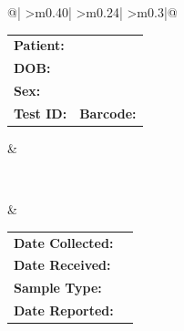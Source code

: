 \documentclass[10pt, letterpaper]{article}
\begin{document}
\begin{tabularx}{\textwidth}{@{}|%
    >{\RaggedRight\arraybackslash}m{0.40\textwidth}|%
    >{\centering\arraybackslash}m{0.24\textwidth}|%
    >{\RaggedRight\arraybackslash}m{0.3\textwidth}|@{}}
\begin{minipage}[t]{\linewidth}
  \vspace{0.5pt}
  \BodyFont
  \begin{tabular}{@{}l l@{}}
    \textbf{Patient:} & \Val{PatientFirstName} \Val{PatientLastName} \\[4pt]
    \textbf{DOB:}     & \Val{PatientDOB} \\[4pt]
    \textbf{Sex:}     & \Val{PatientSex} \\[6pt]
    \textbf{Test ID:} & \Val{TestID} \quad \textbf{Barcode:} \Val{Barcode}
  \end{tabular}
  \vspace{2pt}
\end{minipage}
&
\begin{minipage}[t]{\linewidth}
  \vspace{3pt}
  \BodyFont
  \centering
  \\[8pt]
  \vspace{2pt}
\end{minipage}
&
\begin{minipage}[t]{\linewidth}
  \vspace{0.5pt}
  \BodyFont
  \begin{tabular}{@{}l l@{}}
    \textbf{Date Collected:} & \Val{DateCollected} \\[4pt]
    \textbf{Date Received:}  & \Val{DateReceived} \\[4pt]
    \textbf{Sample Type:}    & \Val{SampleType} \\[4pt]
    \textbf{Date Reported:}    & \Val{ReportDate}
  \end{tabular}
  \vspace{2pt}
\end{minipage}
\\ \hline
\end{tabularx}


\vspace{15pt}

\end{document}
